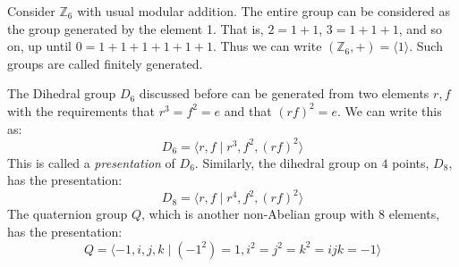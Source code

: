         \begin{example}
            Consider $\mathbb{Z}_{6}$ with usual modular addition. The entire
            group can be considered as the group generated by the element 1.
            That is, $2=1+1$, $3=1+1+1$, and so on, up until $0=1+1+1+1+1+1$.
            Thus we can write $(\mathbb{Z}_{6},+)=\langle{1}\rangle$. Such
            groups are called finitely generated.
        \end{example}
        \begin{example}
            The Dihedral group $D_{6}$ discussed before can be generated from
            two elements $r,f$ with the requirements that $r^{3}=f^{2}=e$ and
            that $(rf)^{2}=e$. We can write this as:
            \begin{equation}
                D_{6}=\langle{r},f\;|\;r^{3},f^{2},(rf)^{2}\rangle
            \end{equation}
            This is called a \textit{presentation} of
            $D_{6}$. Similarly, the dihedral group on $4$ points, $D_{8}$, has
            the presentation:
            \begin{equation}
                D_{8}=\langle{r},f\;|\;r^{4},f^{2},(rf)^{2}\rangle
            \end{equation}
            The quaternion group $Q$, which is another non-Abelian group with 8
            elements, has the presentation:
            \begin{equation}
                Q=\langle\minus{1},i,j,k\;|\;(\minus{1}^{2})=1,
                    i^{2}=j^{2}=k^{2}=ijk=\minus{1}\rangle
            \end{equation}
        \end{example}
